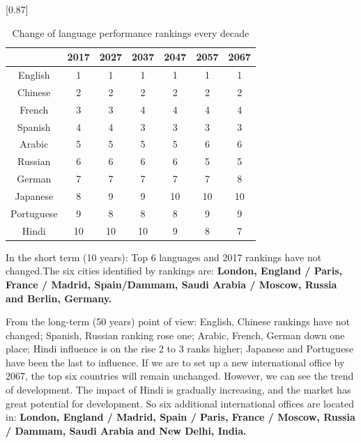\begin{table}[H]
	\centering
	\caption{Change of language performance rankings every decade}
		 \scalebox{0.87}[0.87]{%
	\begin{tabular*}{40em}{@{\extracolsep{\fill}}ccccccc}
		\toprule
		\multicolumn{1}{r}{\backslashbox[0pt][l]{Language}{Year}} & 2017  & 2027  & 2037  & 2047  & 2057  & 2067 \\
		\midrule
		English & 1     & 1     & 1     & 1     & 1     & 1 \\
		\midrule
		Chinese & 2     & 2     & 2     & 2     & 2     & 2 \\
		\midrule
		French & 3     & 3     & 4     & 4     & 4     & 4 \\
		\midrule
		Spanish & 4     & 4     & 3     & 3     & 3     & 3 \\
		\midrule
		Arabic & 5     & 5     & 5     & 5     & 6     & 6 \\
		\midrule
		Russian & 6     & 6     & 6     & 6     & 5     & 5 \\
		\midrule
		German & 7     & 7     & 7     & 7     & 7     & 8 \\
		\midrule
		Japanese & 8     & 9     & 9     & 10    & 10    & 10 \\
		\midrule
		Portuguese & 9     & 8     & 8     & 8     & 9     & 9 \\
		\midrule
		Hindi & 10    & 10    & 10    & 9     & 8     & 7 \\
		\bottomrule
	\end{tabular*}%
}
	\label{tab:Change}%
\end{table}%

\par In the short term (10 years): Top 6 languages and 2017 rankings have not changed.The six cities identified by rankings are: \textbf{London, England / Paris, France / Madrid, Spain/Dammam, Saudi Arabia / Moscow, Russia and Berlin, Germany.}
\par From the long-term (50 years) point of view: English, Chinese rankings have not changed; Spanish, Russian ranking rose one; Arabic, French, German down one place; Hindi influence is on the rise 2 to 3 ranks higher; Japanese and Portuguese have been the last to influence. If we are to set up a new international office by 2067, the top six countries will remain unchanged. However, we can see the trend of development. The impact of Hindi is gradually increasing, and the market has great potential for development. So six additional international offices are located in:\textbf{ London, England / Madrid, Spain / Paris, France / Moscow, Russia / Dammam, Saudi Arabia and New Delhi, India.}

